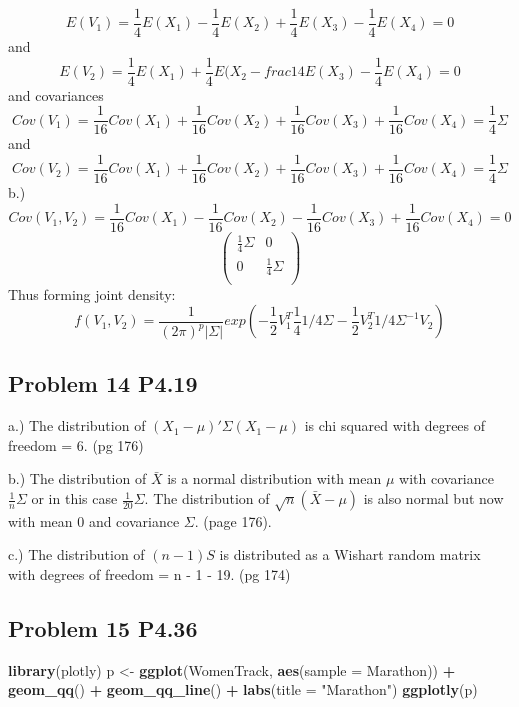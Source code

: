 \documentclass[
]{article}
\newenvironment{Shaded}{\begin{snugshade}}{\end{snugshade}}
\newcommand{\DataTypeTok}[1]{\textcolor[rgb]{0.13,0.29,0.53}{#1}}
\newcommand{\KeywordTok}[1]{\textcolor[rgb]{0.13,0.29,0.53}{\textbf{#1}}}
\newcommand{\NormalTok}[1]{#1}
\newcommand{\OperatorTok}[1]{\textcolor[rgb]{0.81,0.36,0.00}{\textbf{#1}}}
\newcommand{\StringTok}[1]{\textcolor[rgb]{0.31,0.60,0.02}{#1}}
\begin{document}
\[
E(V_1) = \frac{1}{4}E(X_1) - \frac{1}{4}E(X_2) + \frac{1}{4}E(X_3) - \frac{1}{4}E(X_4) = 0
\] and \[
E(V_2) = \frac{1}{4}E(X_1) + \frac{1}{4}E(X_2 - frac{1}{4}E(X_3) - \frac{1}{4}E(X_4) = 0
\] and covariances \[
Cov(V_1) = \frac{1}{16}Cov(X_1) + \frac{1}{16}Cov(X_2) + \frac{1}{16}Cov(X_3) + \frac{1}{16}Cov(X_4) = \frac{1}{4}\Sigma
\] and \[
Cov(V_2) = \frac{1}{16}Cov(X_1) + \frac{1}{16}Cov(X_2) + \frac{1}{16}Cov(X_3) + \frac{1}{16}Cov(X_4) = \frac{1}{4}\Sigma
\] b.) \[
Cov(V_1, V_2) = \frac{1}{16}Cov(X_1) - \frac{1}{16}Cov(X_2) - \frac{1}{16}Cov(X_3) + \frac{1}{16}Cov(X_4) = 0
\] \[
\begin{pmatrix}
\frac{1}{4}\Sigma & 0 \\
0 &   \frac{1}{4}\Sigma \\
\end{pmatrix}
\] Thus forming joint density: \[
f(V_1, V_2) = \frac{1}{(2\pi)^p|\Sigma|} exp(-\frac{1}{2}V_1^T\frac{1}{4}1/4\Sigma - \frac{1}{2} V_2^T1/4\Sigma^{-1}V_2)
\]

\hypertarget{problem-14-p4.19}{%
\subsection{Problem 14 P4.19}\label{problem-14-p4.19}}

a.) The distribution of \((X_1 - \mu)'\Sigma(X_1 - \mu)\) is chi squared
with degrees of freedom = 6. (pg 176)

b.) The distribution of \(\bar{X}\) is a normal distribution with mean
\(\mu\) with covariance \(\frac{1}{n}\Sigma\) or in this case
\(\frac{1}{20}\Sigma\). The distribution of \(\sqrt{n}(\bar{X} - \mu)\)
is also normal but now with mean 0 and covariance \(\Sigma\). (page
176).

c.) The distribution of \((n - 1)S\) is distributed as a Wishart random
matrix with degrees of freedom = n - 1 - 19. (pg 174)

\hypertarget{problem-15-p4.36}{%
\subsection{Problem 15 P4.36}\label{problem-15-p4.36}}

\begin{Shaded}
\begin{Highlighting}[]
\KeywordTok{library}\NormalTok{(plotly)}
\NormalTok{p <-}\StringTok{ }\KeywordTok{ggplot}\NormalTok{(WomenTrack, }\KeywordTok{aes}\NormalTok{(}\DataTypeTok{sample =}\NormalTok{ Marathon)) }\OperatorTok{+}\StringTok{ }\KeywordTok{geom_qq}\NormalTok{() }\OperatorTok{+}\StringTok{ }\KeywordTok{geom_qq_line}\NormalTok{() }\OperatorTok{+}\StringTok{ }\KeywordTok{labs}\NormalTok{(}\DataTypeTok{title =} \StringTok{"Marathon"}\NormalTok{)}
\KeywordTok{ggplotly}\NormalTok{(p)}
\end{Highlighting}
\end{Shaded}
\end{document}
